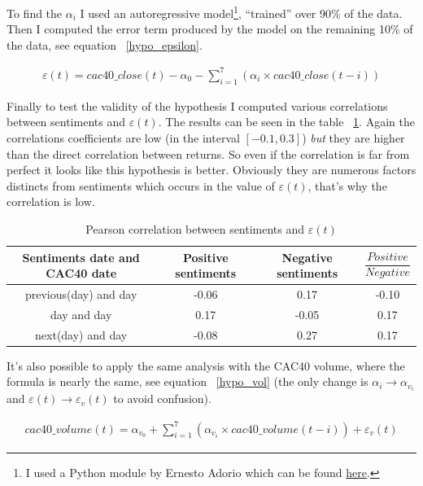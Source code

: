 \documentclass[12pt]{report}
\begin{document}
			To find the $\alpha_i$ I used an autoregressive model\footnote{I used a Python module by Ernesto Adorio which can be found \href{http://adorio-research.org/wordpress/?p=4551}{here}.}, ``trained'' over 90\% of the data. Then I computed the error term produced by the model on the remaining 10\% of the data, see equation ~\ref{hypo_epsilon}.

			\begin{eqnarray}
				\varepsilon(t) = cac40\_close(t) - \alpha_0 - \sum_{i = 1}^{7} \left(\alpha_i\times{}cac40\_close(t - i)\right)\label{hypo_epsilon}
			\end{eqnarray}

			Finally to test the validity of the hypothesis I computed various correlations between sentiments and $\varepsilon(t)$. The results can be seen in the table ~\ref{pearson_cac_ar}. Again the correlations coefficients are low (in the interval $[-0.1, 0.3]$) \emph{but} they are higher than the direct correlation between returns. So even if the correlation is far from perfect it looks like this hypothesis is better. Obviously they are numerous factors distincts from sentiments which occurs in the value of $\varepsilon(t)$, that's why the correlation is low.

			\begin{table}
			\begin{tabular}{|c | c | c | c|}
				\hline
				Sentiments date and CAC40 date & Positive sentiments & Negative sentiments & $\dfrac{Positive}{Negative}$\\
				\hline
				previous(day) and day & -0.06 & 0.17 & -0.10\\
				\hline
				day and day & 0.17 & -0.05 & 0.17\\
				\hline
				next(day) and day & -0.08 & 0.27 & 0.17\\
				\hline
			\end{tabular}

			\caption{Pearson correlation between sentiments and $\varepsilon(t)$\label{pearson_cac_ar}}
			\end{table}

			It's also possible to apply the same analysis with the CAC40 volume, where the formula is nearly the same, see equation ~\ref{hypo_vol} (the only change is $\alpha_i \rightarrow \alpha_{v_i}$ and $\varepsilon(t) \rightarrow \varepsilon_v(t)$ to avoid confusion).

			\begin{eqnarray}
				cac40\_volume(t) = \alpha_{v_0} + \sum_{i = 1}^{7}\left(\alpha_{v_i}\times{}cac40\_volume(t - i)\right) + \varepsilon_v(t)\label{hypo_vol}
			\end{eqnarray}
\end{document}
